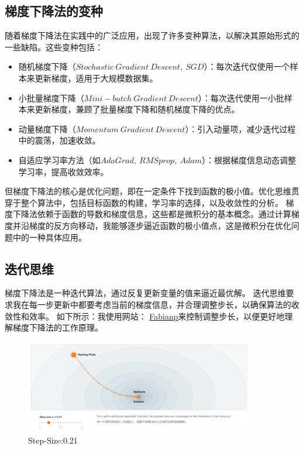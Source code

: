\documentclass[printMode=false, declarePage=false]{ecnuthesis}
\begin{document}
    \subsection{梯度下降法的变种}
    随着梯度下降法在实践中的广泛应用，出现了许多变种算法，以解决其原始形式的一些缺陷。这些变种包括：
    \begin{itemize}
        \item 随机梯度下降（$Stochastic\ Gradient\ Descent,\ SGD$）：每次迭代仅使用一个样本来更新梯度，适用于大规模数据集。
        \item 小批量梯度下降（$Mini-batch\ Gradient\ Descent$）：每次迭代使用一小批样本来更新梯度，兼顾了批量梯度下降和随机梯度下降的优点。
        \item 动量梯度下降（$Momentum\ Gradient\ Descent$）：引入动量项，减少迭代过程中的震荡，加速收敛。
        \item 自适应学习率方法（如$AdaGrad,\ RMSprop,\ Adam$）：根据梯度信息动态调整学习率，提高收敛效率。
    \end{itemize}

    但梯度下降法的核心是优化问题，即在一定条件下找到函数的极小值。优化思维贯穿于整个算法中，包括目标函数的构建，学习率的选择，以及收敛性的分析。
    梯度下降法依赖于函数的导数和梯度信息，这些都是微积分的基本概念。通过计算梯度并沿梯度的反方向移动，我能够逐步逼近函数的极小值点，这是微积分在优化问题中的一种具体应用。
    
    \subsection{迭代思维}
    梯度下降法是一种迭代算法，通过反复更新变量的值来逼近最优解。\cite{haji2021comparison}
    迭代思维要求我在每一步更新中都要考虑当前的梯度信息，并合理调整步长，以确保算法的收敛性和效率。
    如下所示：我使用网站：
    \href{https://fa.bianp.net/teaching/2018/COMP-652/gradient_descent.html}{Fabianp}来控制调整步长，以便更好地理解梯度下降法的工作原理。
    
    \begin{figure} [H]
        \centering
        \includegraphics[width=0.9\textwidth]{Step021.png}
        \caption{Step-Size:0.21}
        \label{fig:gradient-descent}
    \end{figure}
\end{document}
